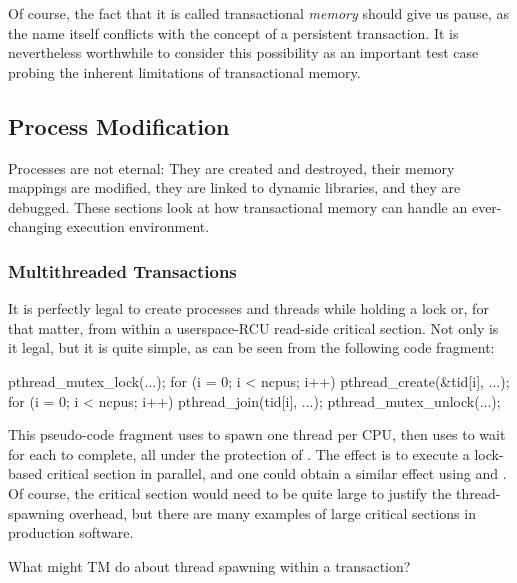 Of course, the fact that it is called transactional \emph{memory}
should give us pause, as the name itself conflicts with the concept of
a persistent transaction.
It is nevertheless worthwhile to consider this possibility as an important
test case probing the inherent limitations of transactional memory.

\subsection{Process Modification}
\label{sec:future:Process Modification}

Processes are not eternal:
They are created and destroyed, their memory mappings are modified,
they are linked to dynamic libraries, and they are debugged.
These sections look at how transactional memory can handle an
ever-changing execution environment.

\subsubsection{Multithreaded Transactions}
\label{sec:future:Multithreaded Transactions}

It is perfectly legal to create processes and threads while holding
a lock or, for that matter, from within a userspace-RCU read-side critical
section.
Not only is it legal, but it is quite simple, as can be seen from the
following code fragment:

\begin{VerbatimN}
pthread_mutex_lock(...);
for (i = 0; i < ncpus; i++)
	pthread_create(&tid[i], ...);
for (i = 0; i < ncpus; i++)
	pthread_join(tid[i], ...);
pthread_mutex_unlock(...);
\end{VerbatimN}

This pseudo-code fragment uses  to spawn one thread
per CPU, then uses  to wait for each to complete,
all under the protection of .
The effect is to execute a lock-based critical section in parallel,
and one could obtain a similar effect using  and .
Of course, the critical section would need to be quite large to justify
the thread-spawning overhead, but there are many examples of large
critical sections in production software.

What might TM do about thread spawning within a transaction?

